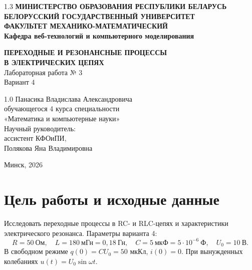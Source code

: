 \documentclass[12pt,a4paper]{article}
\begin{document}
\begin{titlepage}
\begin{center}
\begin{spacing}{1.3}
\textbf{МИНИСТЕРСТВО ОБРАЗОВАНИЯ РЕСПУБЛИКИ БЕЛАРУСЬ}\\[0.25cm]
\textbf{БЕЛОРУССКИЙ ГОСУДАРСТВЕННЫЙ УНИВЕРСИТЕТ}\\[0.25cm]
\textbf{ФАКУЛЬТЕТ МЕХАНИКО-МАТЕМАТИЧЕСКИЙ}\\[0.25cm]
\textbf{Кафедра веб-технологий и компьютерного моделирования}
\end{spacing}
\vspace{4.2cm}
\textbf{ПЕРЕХОДНЫЕ И РЕЗОНАНСНЫЕ ПРОЦЕССЫ\\
В ЭЛЕКТРИЧЕСКИХ ЦЕПЯХ}\\[0.4cm]
Лабораторная работа № 3\\[0.2cm]
Вариант 4
\end{center}
\vspace{3.2cm}
\noindent\hspace*{0.48\textwidth}\begin{minipage}{0.52\textwidth}
\begin{spacing}{1.0}
Панасика Владислава Александровича\\
обучающегося 4 курса специальности\\
«Математика и компьютерные науки»\\[0.6cm]
Научный руководитель:\\
ассистент КФОиПИ,\\
Полякова Яна Владимировна
\end{spacing}
\end{minipage}
\vfill
\begin{center}Минск, 2026\end{center}
\end{titlepage}
\setcounter{page}{2}
\tableofcontents
\clearpage

\section*{Цель работы и исходные данные}
Исследовать переходные процессы в RC- и RLC-цепях и характеристики
электрического резонанса. Параметры варианта 4:
\[
R=50\ \text{Ом},\quad L=180\ \text{мГн}=0{,}18\ \text{Гн},\quad
C=5\ \text{мкФ}=5\cdot10^{-6}\ \text{Ф},\quad U_0=10\ \text{В}.
\]
В свободном режиме $q(0)=CU_0=50$ мкКл, $i(0)=0$.
При вынужденных колебаниях $u(t)=U_0\sin\omega t$.
\end{document}

